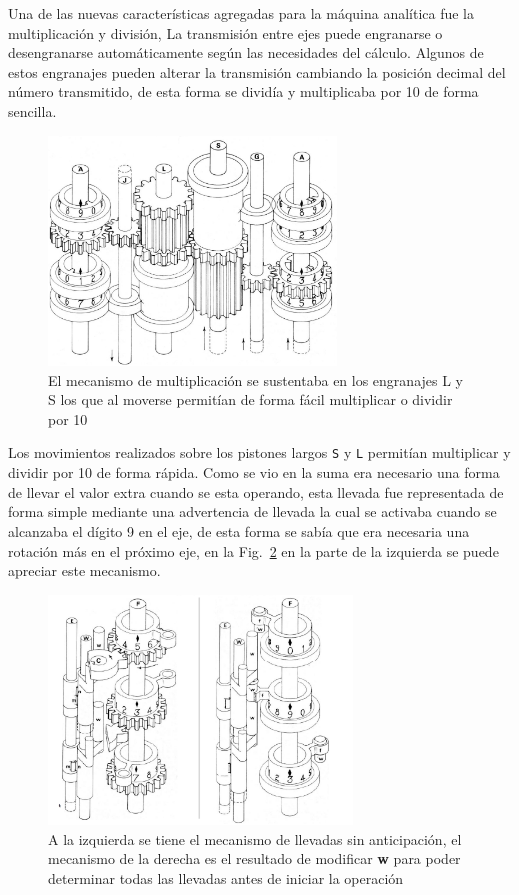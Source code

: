 \documentclass[runningheads,a4paper]{llncs}
\begin{document}
Una de las nuevas características agregadas para la máquina analítica fue la multiplicación y división, 
La transmisión entre ejes puede engranarse o desengranarse automáticamente según las necesidades del 
cálculo. Algunos de estos engranajes pueden alterar la transmisión cambiando la posición decimal del 
número transmitido, de esta forma se dividía y multiplicaba por 10 de forma sencilla.

\begin{figure}
	\centering
	\includegraphics[height=6.1cm]{imgs/Mult}
	\caption{El mecanismo de multiplicación se sustentaba en los engranajes L y S los que al moverse permitían de forma 
	fácil multiplicar o dividir por 10}
	\label{fig:Mult}
\end{figure}

Los movimientos realizados sobre los pistones largos \verb*|S| y \verb*|L| permitían multiplicar y 
dividir por 10 de forma rápida. Como se vio en la suma era necesario una forma de llevar el valor extra 
cuando se esta operando, esta llevada fue representada de forma simple mediante una advertencia de 
llevada la cual se activaba cuando se alcanzaba el dígito 9 en el eje, de esta forma se sabía que 
era necesaria una rotación más en el próximo eje, en la Fig.~\ref{fig:Carry} en la parte de la izquierda 
se puede apreciar este mecanismo.

\begin{figure}
	\centering
	\includegraphics[height=6.1cm]{imgs/Carry}
	\caption{A la izquierda se tiene el mecanismo de llevadas sin anticipación, el mecanismo de la derecha es el resultado de modificar \textbf{w} para poder determinar todas las llevadas antes de iniciar la operación}
	\label{fig:Carry}
\end{figure}
\end{document}
